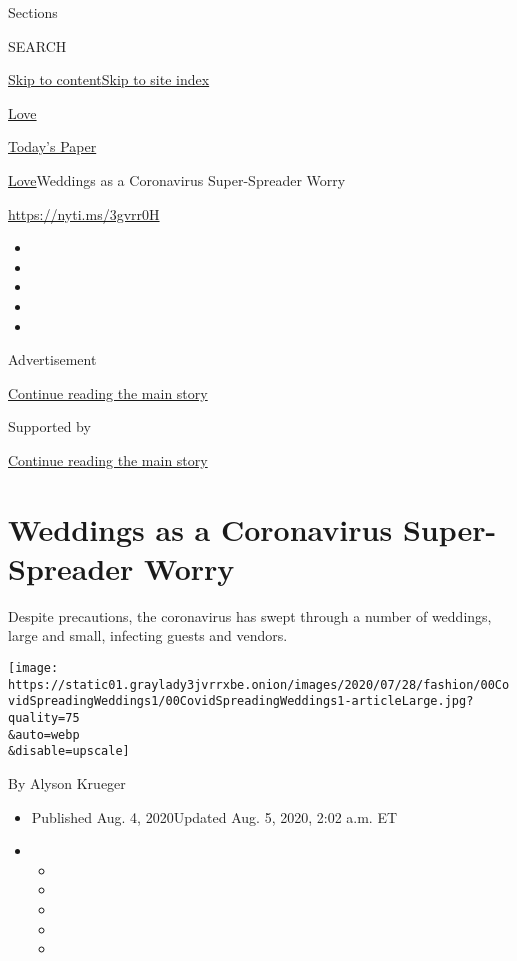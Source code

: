 Sections

SEARCH

\protect\hyperlink{site-content}{Skip to
content}\protect\hyperlink{site-index}{Skip to site index}

\href{https://www.nytimes3xbfgragh.onion/section/fashion/weddings}{Love}

\href{https://myaccount.nytimes3xbfgragh.onion/auth/login?response_type=cookie\&client_id=vi}{}

\href{https://www.nytimes3xbfgragh.onion/section/todayspaper}{Today's
Paper}

\href{/section/fashion/weddings}{Love}\textbar{}Weddings as a
Coronavirus Super-Spreader Worry

\href{https://nyti.ms/3gvrr0H}{https://nyti.ms/3gvrr0H}

\begin{itemize}
\item
\item
\item
\item
\item
\end{itemize}

Advertisement

\protect\hyperlink{after-top}{Continue reading the main story}

Supported by

\protect\hyperlink{after-sponsor}{Continue reading the main story}

\hypertarget{weddings-as-a-coronavirus-super-spreader-worry}{%
\section{Weddings as a Coronavirus Super-Spreader
Worry}\label{weddings-as-a-coronavirus-super-spreader-worry}}

Despite precautions, the coronavirus has swept through a number of
weddings, large and small, infecting guests and vendors.

\texttt{[image: https://static01.graylady3jvrrxbe.onion/images/2020/07/28/fashion/00CovidSpreadingWeddings1/00CovidSpreadingWeddings1-articleLarge.jpg?quality=75\\\&auto=webp\\\&disable=upscale]}

By Alyson Krueger

\begin{itemize}
\item
  Published Aug. 4, 2020Updated Aug. 5, 2020, 2:02 a.m. ET
\item
  \begin{itemize}
  \item
  \item
  \item
  \item
  \item
  \end{itemize}
\end{itemize}

